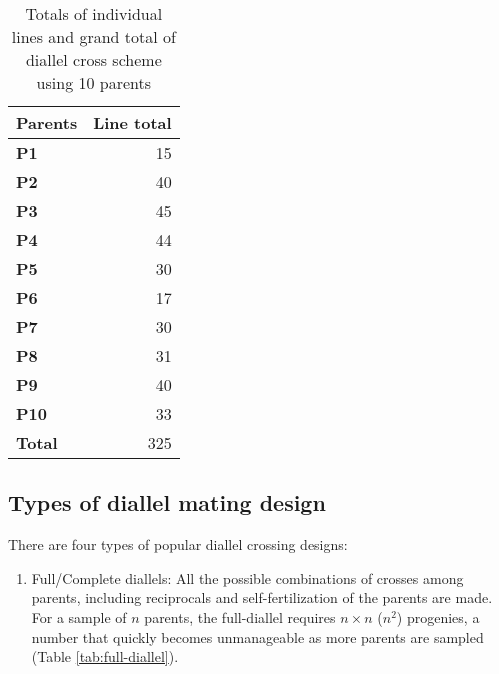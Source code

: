 \documentclass[nofonts,]{tufte-handout}
\providecommand{\tightlist}{%
  \setlength{\itemsep}{0pt}\setlength{\parskip}{0pt}}
\begin{document}
\begin{table}

\caption{\label{tab:sum-over-ind}Totals of individual lines and grand total of diallel cross
 scheme using 10 parents}
\centering
\fontsize{10}{12}\selectfont
\begin{tabular}[t]{>{\bfseries}lr}
\toprule
Parents & Line total\\
\midrule
\rowcolor{gray!6}  P1 & 15\\
P2 & 40\\
\rowcolor{gray!6}  P3 & 45\\
P4 & 44\\
\rowcolor{gray!6}  P5 & 30\\
\addlinespace
P6 & 17\\
\rowcolor{gray!6}  P7 & 30\\
P8 & 31\\
\rowcolor{gray!6}  P9 & 40\\
P10 & 33\\
\addlinespace
\rowcolor{gray!6}  Total & 325\\
\bottomrule
\end{tabular}
\end{table}

\hypertarget{types-of-diallel-mating-design}{%
\subsection{Types of diallel mating
design}\label{types-of-diallel-mating-design}}

There are four types of popular diallel crossing designs:

\begin{enumerate}
\def\labelenumi{\arabic{enumi}.}
\tightlist
\item
  Full/Complete diallels: All the possible combinations of crosses among
  parents, including reciprocals and self-fertilization of the parents
  are made. For a sample of \(n\) parents, the full-diallel requires
  \(n \times n\) (\(n^2\)) progenies, a number that quickly becomes
  unmanageable as more parents are sampled (Table
  \ref{tab:full-diallel}).
\end{enumerate}

\begingroup\fontsize{8}{10}\selectfont
\end{document}

